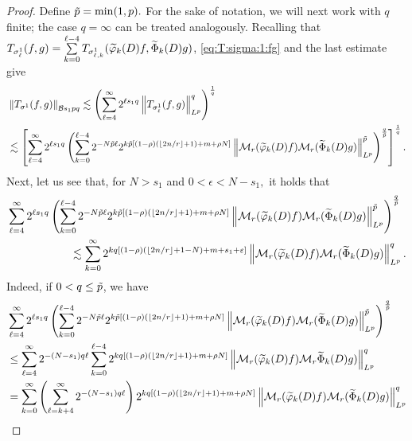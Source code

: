 \begin{proof}
  Define $\tilde{p}=\min(1,p).$  For the sake of notation, we will next work with $q$ finite; the case $q=\infty$ can be treated analogously.
  Recalling that $T_{\sigma^1_\ell}(f,g)= \sum\limits_{k=0}^{\ell -4} T_{\sigma^1_{\ell,k}}(\widetilde{\varphi}_k(D)f,\widetilde{\Phi}_k(D)g)$,  \eqref{eq:T:sigma:1:fg} and the last  estimate give
\begin{align}
& \left\|T_{\sigma^1}(f,g)\right\|_{\mathcal{B}{s_1}{p}{q}}  \lesssim  \left( \sum\limits_{\ell=4}^\infty 2^{\ell s_1q} \left\|T_{\sigma^1_\ell}(f,g)\right\|_{L^p}^q \right)^\frac{1}{q}\label{eq:T1:fg:Fqp}\\
& \lesssim  \left[  \sum\limits_{\ell=4}^\infty 2^{\ell s_1 q} \left(  \sum\limits_{k=0}^{\ell -4} 2^{- N\tilde{p} \ell} 2^{k\tilde{p} [(1-\rho)( \lfloor{2n/r}\rfloor + 1)+m+\rho N]}   \left\|\mathcal{M}_r(\widetilde{\varphi}_k(D)f)\mathcal{M}_r(\widetilde{\Phi}_k(D)g)\right\|_{L^p}^{\tilde{p}}\right)^\frac{q}{\tilde{p}} \right]^\frac{1}{q}. \nonumber
\end{align}
Next, let us see that, for  $N>s_1$ and $0<\epsilon< N-s_1,$  it holds that
\begin{align}\nonumber
& \sum\limits_{\ell=4}^\infty 2^{\ell  s_1 q} \left(  \sum\limits_{k=0}^{\ell -4} 2^{- N \tilde{p}\ell} 2^{k \tilde{p}[(1-\rho)( \lfloor{2n/r}\rfloor + 1)+m+\rho N]}    \left\|\mathcal{M}_r(\widetilde{\varphi}_k(D)f)\mathcal{M}_r(\widetilde{\Phi}_k(D)g)\right\|_{L^p}^{\tilde{p}}\right)^{\frac{q}{\tilde{p}}} \\ \label{eq:moving:the:sums}
&\hspace{2cm}\lesssim \sum\limits_{k=0}^\infty 2^{k q[ (1-\rho)( \lfloor{2n/r}\rfloor + 1-N) + m+ s_1+\varepsilon] }   \left\|\mathcal{M}_r(\widetilde{\varphi}_k(D)f)\mathcal{M}_r(\widetilde{\Phi}_k(D)g)\right\|_{L^p}^q.
\end{align}
 Indeed, if $0 < q \leq \tilde{p}$, we have
\begin{align*}
& \sum\limits_{\ell=4}^\infty  2^{\ell  s_1 q} \left(  \sum\limits_{k=0}^{\ell -4} 2^{- N \pst \ell} 2^{k \pst [(1-\rho)( \lfloor{2n/r}\rfloor + 1)+m+\rho N]}   \norm{\mathcal{M}_r(\widetilde{\f}_k(D)f)\mathcal{M}_r(\widetilde{\Phi}_k(D)g)}{L^p}^{\pst}\right)^\frac{q}{\pst} \\
& \leq \sum\limits_{\ell=4}^\infty 2^{-(N-s_1) q \ell} \sum\limits_{k=0}^{\ell -4}  2^{k q [(1-\rho)( \lfloor{2n/r}\rfloor + 1) + m+\rho N]}   \norm{\mathcal{M}_r(\widetilde{\f}_k(D)f)\mathcal{M}_r\widetilde{\Phi}_k(D)g)}{L^p}^q\\
&= \sum_{k=0}^{\infty} \left(\sum_{\ell=k+4}^\infty 2^{-(N-s_1) q \ell} \right)  2^{k q [(1-\rho)( \lfloor{2n/r}\rfloor + 1) + m+\rho N]}   \norm{\mathcal{M}_r(\widetilde{\f}_k(D)f)\mathcal{M}_r(\widetilde{\Phi}_k(D)g)}{L^p}^q \\

\end{align*}
\end{proof}
